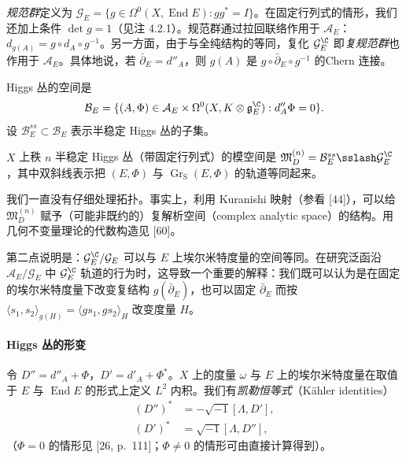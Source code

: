 \emph{规范群}定义为 $\mathcal{G}_E=\{g\in\Omega^0(X,\operatorname{End}E): gg^*=I\}$。在固定行列式的情形，我们还加上条件 $\det g=1$（见注 4.2.1）。规范群通过拉回联络作用于 $\mathcal{A}_E$：$d_{g(A)}=g\circ d_A\circ g^{-1}$。另一方面，由于与全纯结构的等同，复化 $\mathcal{G}_E^\C$ 即\emph{复规范群}也作用于 $\mathcal{A}_E$。具体地说，若 $\bar\partial_E=d''_A$，则 $g(A)$ 是 $g\circ\bar\partial_E\circ g^{-1}$ 的Chern 连接。

Higgs 丛的空间是
\[
\mathcal{B}_E=\{(A,\Phi)\in\mathcal{A}_E\times\Omega^0(X,K\otimes\mathfrak{g}^\C_E): d''_A\Phi=0\}.
\]
设 $\mathcal{B}^{ss}_E\subset\mathcal{B}_E$ 表示半稳定 Higgs 丛的子集。

\begin{definition}\label{def:4.2.11}
$X$ 上秩 $n$ 半稳定 Higgs 丛（带固定行列式）的模空间是 $\mathfrak{M}_D^{(n)}=\mathcal{B}^{ss}_E\sslash \mathcal{G}_E^\C$，其中双斜线表示把 $(E,\Phi)$ 与 $\operatorname{Gr}_{\mathrm{S}}(E,\Phi)$ 的轨道等同起来。
\end{definition}

我们一直没有仔细处理拓扑。事实上，利用 Kuranishi 映射（参看 [44]），可以给 $\mathfrak{M}_D^{(n)}$ 赋予（可能非既约的）复解析空间（complex analytic space）的结构。用几何不变量理论的代数构造见 [60]。

第二点说明是：$\mathcal{G}_E^\C/\mathcal{G}_E$ 可以与 $E$ 上埃尔米特度量的空间等同。在研究泛函沿 $\mathcal{A}_E/\mathcal{G}_E$ 中 $\mathcal{G}_E^\C$ 轨道的行为时，这导致一个重要的解释：我们既可以认为是在固定的埃尔米特度量下改变复结构 $g(\bar\partial_E)$，也可以固定 $\bar\partial_E$ 而按 $\langle s_1,s_2\rangle_{g(H)}=\langle gs_1,gs_2\rangle_H$ 改变度量 $H$。

\paragraph{Higgs 丛的形变} 令 $D''=d''_A+\Phi$，$D'=d'_A+\Phi^*$。$X$ 上的度量 $\omega$ 与 $E$ 上的埃尔米特度量在取值于 $E$ 与 $\operatorname{End}E$ 的形式上定义 $L^2$ 内积。我们有\emph{凯勒恒等式}（Kähler identities）
\begin{equation}
\begin{aligned}
(D'')^*&=-\sqrt{-1}[\Lambda,D'],\\
(D')^*&=\sqrt{-1}[\Lambda,D''],
\end{aligned}
\label{eq:4.6}\tag{4.6}
\end{equation}
（$\Phi=0$ 的情形见 [26, p.~111]；$\Phi\ne0$ 的情形可由直接计算得到）。

